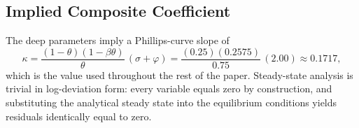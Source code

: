 \subsection{Implied Composite Coefficient}
\label{sec:calibration_kappa}

The deep parameters imply a Phillips-curve slope of
\begin{equation}
  \kappa
  =\frac{(1-\theta)(1-\beta\theta)}{\theta}\,(\sigma+\varphi)
  =\frac{(0.25)(0.2575)}{0.75}\,(2.00)
  \approx 0.1717,
  \label{eq:kappa}
\end{equation}
which is the value used throughout the rest of the paper. Steady-state
analysis is trivial in log-deviation form: every variable equals zero by
construction, and substituting the analytical steady state into the
equilibrium conditions yields residuals identically equal to zero.
